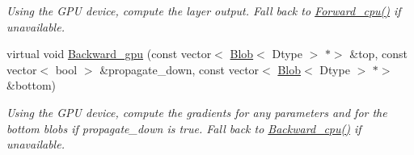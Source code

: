 \begin{DoxyCompactItemize}
\begin{DoxyCompactList}\small\item\em Using the G\+PU device, compute the layer output. Fall back to \mbox{\hyperlink{classcaffe_1_1_reshape_layer_a0529c00e9d2fa47943ba5292cfdcb6db}{Forward\+\_\+cpu()}} if unavailable. \end{DoxyCompactList}\item 
\mbox{\label{classcaffe_1_1_reshape_layer_a7f433223bdd7d5e8aa9e73ee9dbea836}} 
virtual void \mbox{\hyperlink{classcaffe_1_1_reshape_layer_a7f433223bdd7d5e8aa9e73ee9dbea836}{Backward\+\_\+gpu}} (const vector$<$ \mbox{\hyperlink{classcaffe_1_1_blob}{Blob}}$<$ Dtype $>$ $\ast$$>$ \&top, const vector$<$ bool $>$ \&propagate\+\_\+down, const vector$<$ \mbox{\hyperlink{classcaffe_1_1_blob}{Blob}}$<$ Dtype $>$ $\ast$$>$ \&bottom)
\begin{DoxyCompactList}\small\item\em Using the G\+PU device, compute the gradients for any parameters and for the bottom blobs if propagate\+\_\+down is true. Fall back to \mbox{\hyperlink{classcaffe_1_1_reshape_layer_a8baafe3b84c6eee7709071a944355286}{Backward\+\_\+cpu()}} if unavailable. \end{DoxyCompactList}\end{DoxyCompactItemize}
